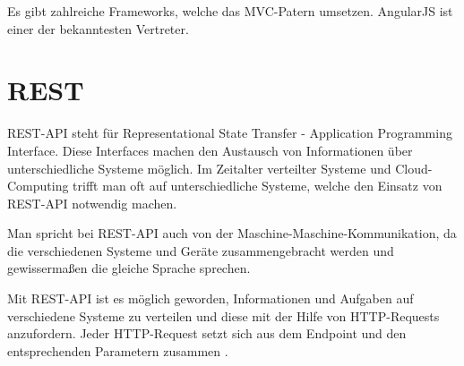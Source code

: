 Es gibt zahlreiche Frameworks, welche das MVC-Patern umsetzen. AngularJS ist einer der bekanntesten Vertreter.

\section{REST}
REST-API steht für Representational State Transfer - Application Programming Interface. Diese Interfaces machen den
Austausch von Informationen über unterschiedliche Systeme möglich. Im Zeitalter verteilter Systeme und Cloud-Computing
trifft man oft auf unterschiedliche Systeme, welche den Einsatz von REST-API notwendig machen.

Man spricht bei REST-API auch von der Maschine-Maschine-Kommunikation, da die verschiedenen Systeme
und Geräte zusammengebracht werden und gewissermaßen die gleiche Sprache sprechen.

Mit REST-API ist es möglich geworden, Informationen und Aufgaben auf verschiedene Systeme zu verteilen und diese mit der
Hilfe von HTTP-Requests anzufordern. Jeder HTTP-Request setzt sich aus dem Endpoint und den entsprechenden Parametern
zusammen \cite{online_grundlagen_rest}.
